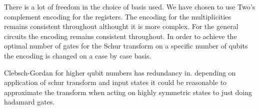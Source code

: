 \documentclass[12pt]{article}
\begin{document}
There is a lot of freedom in the choice of basis used. We have chosen to use Two's complement encoding for the registers. The encoding for the multiplicities remains consistent throughout althought it is more complex. For the general circuits the encoding remains consistent throughout. In order to achieve the optimal number of gates for the Schur transform on a specific number of qubits the encoding is changed on a case by case basis. 

Clebsch-Gordan for higher qubit numbers has redundancy in. depending on application of schur transform and input states it could be reasonable to approximate the transform when acting on highly symmetric states to just doing hadamard gates.





\newpage

\begin{landscape}

\end{landscape}

\end{document}
